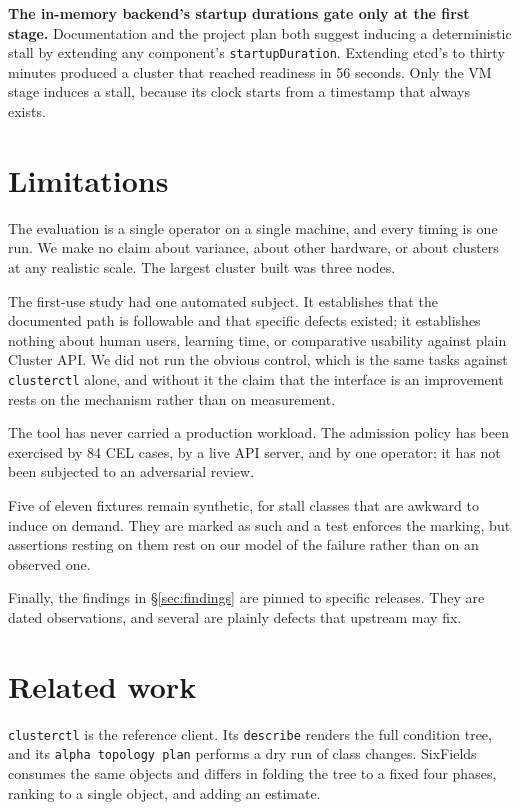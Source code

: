 \documentclass[conference]{IEEEtran}
\begin{document}
\textbf{The in-memory backend's startup durations gate only at the first stage.}
Documentation and the project plan both suggest inducing a deterministic stall by
extending any component's \texttt{startupDuration}. Extending etcd's to thirty
minutes produced a cluster that reached readiness in 56 seconds. Only the VM stage
induces a stall, because its clock starts from a timestamp that always exists.

\section{Limitations}

The evaluation is a single operator on a single machine, and every timing is one
run. We make no claim about variance, about other hardware, or about clusters at
any realistic scale. The largest cluster built was three nodes.

The first-use study had one automated subject. It establishes that the documented
path is followable and that specific defects existed; it establishes nothing about
human users, learning time, or comparative usability against plain Cluster API. We
did not run the obvious control, which is the same tasks against
\texttt{clusterctl} alone, and without it the claim that the interface is an
improvement rests on the mechanism rather than on measurement.

The tool has never carried a production workload. The admission policy has been
exercised by 84 CEL cases, by a live API server, and by one operator; it has not
been subjected to an adversarial review.

Five of eleven fixtures remain synthetic, for stall classes that are awkward to
induce on demand. They are marked as such and a test enforces the marking, but
assertions resting on them rest on our model of the failure rather than on an
observed one.

Finally, the findings in \S\ref{sec:findings} are pinned to specific releases. They
are dated observations, and several are plainly defects that upstream may fix.

\section{Related work}

\texttt{clusterctl} \cite{clusterctl} is the reference client. Its
\texttt{describe} renders the full condition tree, and its
\texttt{alpha topology plan} performs a dry run of class changes. SixFields
consumes the same objects and differs in folding the tree to a fixed four phases,
ranking to a single object, and adding an estimate.
\end{document}
